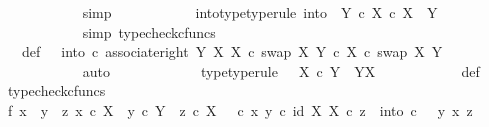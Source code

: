 \begin{isabellebody}
\ \ \ \ \ \ \ \ \ \ \isamarkupfalse%
\ simp\isanewline
\ \ \ \ \ \ \ \ \isamarkupfalse%
\ \isamarkupfalse%
\ into{\isacharunderscore}{\kern0pt}type{\isacharbrackleft}{\kern0pt}type{\isacharunderscore}{\kern0pt}rule{\isacharbrackright}{\kern0pt}{\isacharcolon}{\kern0pt}\ {\isachardoublequoteopen}into\ {\isacharcolon}{\kern0pt}\ Y\ {\isasymtimes}\isactrlsub c\ {\isacharparenleft}{\kern0pt}X\ {\isasymtimes}\isactrlsub c\ X{\isacharparenright}{\kern0pt}\ {\isasymrightarrow}\ Y{\isachardoublequoteclose}\isanewline
\ \ \ \ \ \ \ \ \ \ \isamarkupfalse%
\ {\isacharparenleft}{\kern0pt}simp{\isacharcomma}{\kern0pt}\ typecheck{\isacharunderscore}{\kern0pt}cfuncs{\isacharparenright}{\kern0pt}\isanewline
\ \ \ \isanewline
\isanewline
\ \ \ \ \ \ \ \ \isamarkupfalse%
\ {\isasymTheta}\ \ {\isasymTheta}{\isacharunderscore}{\kern0pt}def{\isacharcolon}{\kern0pt}\ {\isachardoublequoteopen}{\isasymTheta}\ {\isacharequal}{\kern0pt}\ {\isacharparenleft}{\kern0pt}into\ {\isasymcirc}\isactrlsub c\ associate{\isacharunderscore}{\kern0pt}right\ Y\ X\ X\ {\isasymcirc}\isactrlsub c\ swap\ X\ {\isacharparenleft}{\kern0pt}Y\ {\isasymtimes}\isactrlsub c\ X{\isacharparenright}{\kern0pt}{\isacharparenright}{\kern0pt}\isactrlsup {\isasymsharp}\ {\isasymcirc}\isactrlsub c\ swap\ X\ Y{\isachardoublequoteclose}\isanewline
\ \ \ \ \ \ \ \ \ \ \isamarkupfalse%
\ auto\isanewline
\ \ \isanewline
\ \ \ \ \ \ \ \ \isamarkupfalse%
\ {\isasymTheta}{\isacharunderscore}{\kern0pt}type{\isacharbrackleft}{\kern0pt}type{\isacharunderscore}{\kern0pt}rule{\isacharbrackright}{\kern0pt}{\isacharcolon}{\kern0pt}\ {\isachardoublequoteopen}{\isasymTheta}\ {\isacharcolon}{\kern0pt}\ X\ {\isasymtimes}\isactrlsub c\ Y\ {\isasymrightarrow}\ Y\isactrlbsup X\isactrlesup {\isachardoublequoteclose}\isanewline
\ \ \ \ \ \ \ \ \ \ \isamarkupfalse%
\ {\isasymTheta}{\isacharunderscore}{\kern0pt}def\ \isamarkupfalse%
\ typecheck{\isacharunderscore}{\kern0pt}cfuncs\isanewline
\isanewline
\ \ \ \ \ \ \ \ \isamarkupfalse%
\ f{}{\isacharcolon}{\kern0pt}\ {\isachardoublequoteopen}{\isasymAnd}x{\isachardot}{\kern0pt}\ {\isasymAnd}\ y{\isachardot}{\kern0pt}\ {\isasymAnd}\ z{\isachardot}{\kern0pt}\ x\ {\isasymin}\isactrlsub c\ X\ {\isasymand}\ y\ {\isasymin}\isactrlsub c\ Y\ {\isasymand}\ z\ {\isasymin}\isactrlsub c\ X\ {\isasymLongrightarrow}\ {\isacharparenleft}{\kern0pt}{\isasymTheta}\ {\isasymcirc}\isactrlsub c\ {\isasymlangle}x{\isacharcomma}{\kern0pt}\ y{\isasymrangle}{\isacharparenright}{\kern0pt}\isactrlsup {\isasymflat}\ {\isasymcirc}\isactrlsub c\ {\isasymlangle}id\ X{\isacharcomma}{\kern0pt}\ {\isasymbeta}\isactrlbsub X\isactrlesub {\isasymrangle}\ {\isasymcirc}\isactrlsub c\ z\ {\isacharequal}{\kern0pt}\ into\ {\isasymcirc}\isactrlsub c\ \ \ {\isasymlangle}y{\isacharcomma}{\kern0pt}\ {\isasymlangle}x{\isacharcomma}{\kern0pt}\ z{\isasymrangle}{\isasymrangle}{\isachardoublequoteclose}\isanewline

\end{isabellebody}
